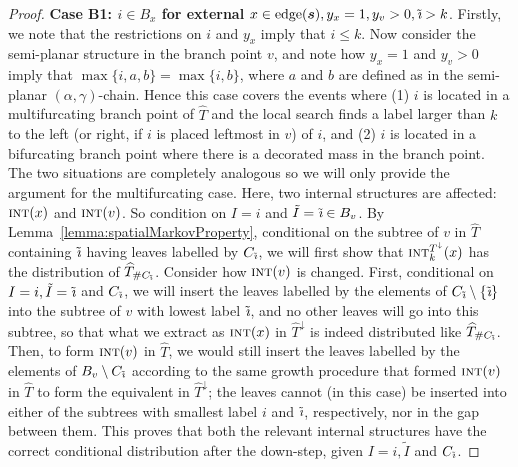 \documentclass[a4paper, final]{amsart}
\theoremstyle{plain}
\theoremstyle{definition}
\newcommand{\tree}[1][t]{\boldsymbol{#1}}
\newcommand{\That}[1][T]{\widehat{#1}}
\DeclareMathOperator{\edge}{edge}
\DeclareMathOperator{\intstruct}{\textsc{int}}
\DeclareMathOperator{\tildei}{\tilde{\textit{\i}}}
\begin{document}
\begin{proof}
\textbf{Case B1: $i \in B_x$ for external} $x \in \edge (\tree[s]), y_x = 1, y_v > 0, \tildei > k$.
  Firstly, we note that the restrictions on $i$ and $y_x$ imply that $i \leq k$.
  Now consider the semi-planar structure in the branch point $v$, and note how $y_x = 1$ and $y_v > 0$ imply that $\max \{i, a, b\} = \max \{i, b\}$, where $a$ and $b$ are defined as in the semi-planar $(\alpha, \gamma)$-chain.
Hence this case covers the events where (1) $i$ is located in a multifurcating branch point of $\That$ and the local search finds a label larger than $k$ to the left (or right, if $i$ is placed leftmost in $v$) of $i$, and (2) $i$ is located in a bifurcating branch point where there is a decorated mass in the branch point.
  The two situations are completely analogous so we will only provide the argument for the multifurcating case.
  Here, two internal structures are affected: $\intstruct(x)$ and $\intstruct(v)$.
  So condition on $I = i$ and $\tilde{I} = \tildei \in B_v$.
  By Lemma~\ref{lemma:spatialMarkovProperty}, conditional on the subtree of $v$ in $\That$ containing $\tildei$ having leaves labelled by $C_{\tildei}$, we will first show that $\intstruct_k^{T^\downarrow}(x)$ has the distribution of $\That_{\# C_{\tildei}}$.
  Consider how $\intstruct(v)$ is changed.
  First, conditional on $I = i, \tilde{I} = \tildei$ and $C_{\tildei}$, we will insert the leaves labelled by the elements of $C_{\tildei} \setminus \{\tildei\}$ into the subtree of $v$ with lowest label $\tildei$, and no other leaves will go into this subtree, so that what we extract as $\intstruct (x)$ in $\That^\downarrow$ is indeed distributed like $\That_{\# C_{\tildei}}$.
  Then, to form $\intstruct(v)$ in $\That$, we would still insert the leaves labelled by the elements of $B_v \setminus C_{\tildei}$ according to the same growth procedure that formed $\intstruct(v)$ in $\That$ to form the equivalent in $\That^\downarrow$; the leaves cannot (in this case) be inserted into either of the subtrees with smallest label $i$ and $\tildei$, respectively, nor in the gap between them.
  This proves that both the relevant internal structures have the correct conditional distribution after the down-step, given $I = i, \tilde{I}$ and $C_{\tildei}$.
  

\end{proof}
\end{document}
